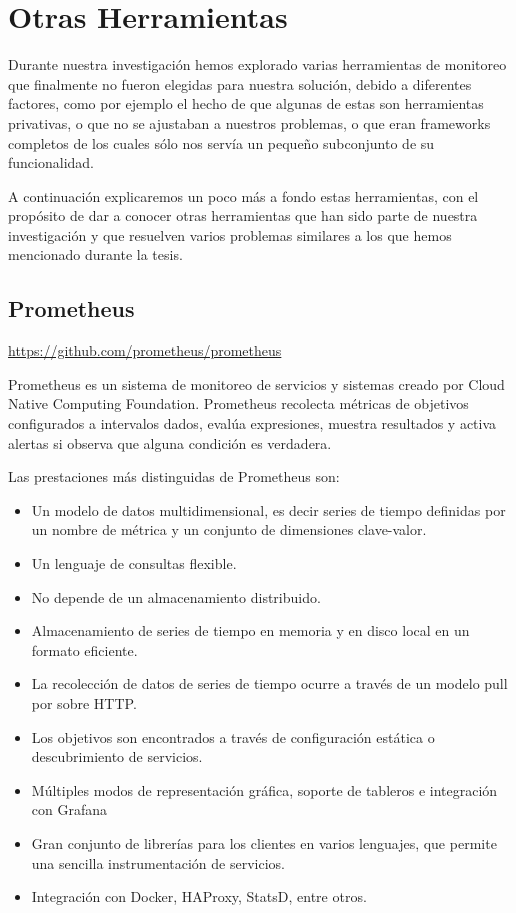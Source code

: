 \section{Otras Herramientas}
\label{anexo:B}

Durante nuestra investigación hemos explorado varias herramientas de monitoreo que finalmente no fueron elegidas para nuestra solución, debido a diferentes factores, como por ejemplo el hecho de que algunas de estas son herramientas privativas, o que no se ajustaban a nuestros problemas, o que eran frameworks completos de los cuales sólo nos servía un pequeño subconjunto de su funcionalidad.

A continuación explicaremos un poco más a fondo estas herramientas, con el propósito de dar a conocer otras herramientas que han sido parte de nuestra investigación y que resuelven varios problemas similares a los que hemos mencionado durante la tesis.

\subsection{Prometheus}

\url{https://github.com/prometheus/prometheus}

Prometheus es un sistema de monitoreo de servicios y sistemas creado por Cloud Native Computing Foundation. Prometheus recolecta métricas de objetivos configurados a intervalos dados, evalúa expresiones, muestra resultados y activa alertas si observa que alguna condición es verdadera.

Las prestaciones más distinguidas de Prometheus son:

\begin{itemize}
  \item Un modelo de datos multidimensional, es decir series de tiempo definidas por un nombre de métrica y un conjunto de dimensiones clave-valor.
  \item Un lenguaje de consultas flexible.
  \item No depende de un almacenamiento distribuido.
  \item Almacenamiento de series de tiempo en memoria y en disco local en un formato eficiente.
  \item La recolección de datos de series de tiempo ocurre a través de un modelo pull por sobre HTTP.
  \item Los objetivos son encontrados a través de configuración estática o descubrimiento de servicios.
  \item Múltiples modos de representación gráfica, soporte de tableros e integración con Grafana
  \item Gran conjunto de librerías para los clientes en varios lenguajes, que permite una sencilla instrumentación de servicios.
  \item Integración con Docker, HAProxy, StatsD, entre otros.
\end{itemize}



